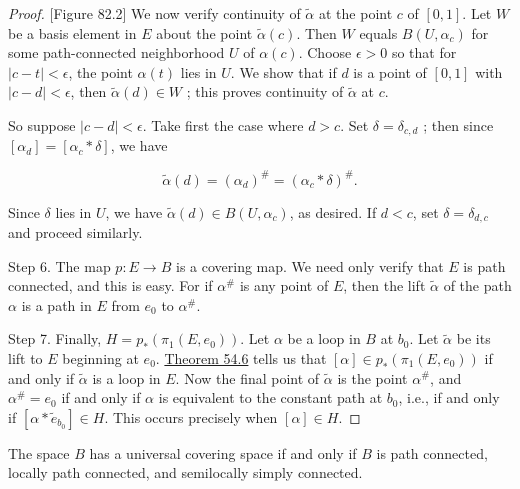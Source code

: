\begin{proof}
[Figure 82.2]
We now verify continuity of \(\widetilde{\alpha }\) at the point \(c\) of \([ {0,1}]\). Let \(W\) be a basis element in \(E\) about the point \(\widetilde{\alpha }( c)\). Then \(W\) equals \(B( {U,{\alpha }_{c}})\) for some path-connected neighborhood \(U\) of \(\alpha ( c)\). Choose \(\epsilon > 0\) so that for \(| {c - t}| < \epsilon\), the point \(\alpha ( t)\) lies in \(U\). We show that if \(d\) is a point of \([ {0,1}]\) with \(| {c - d}| < \epsilon\), then \(\widetilde{\alpha }( d) \in W\) ; this proves continuity of \(\widetilde{\alpha }\) at \(c\).

So suppose \(| {c - d}| < \epsilon\). Take first the case where \(d > c\). Set \(\delta = {\delta }_{c,d}\) ; then since \([ {\alpha }_{d}] = [ {{\alpha }_{c} * \delta }]\), we have

\[
\widetilde{\alpha }( d) = {( {\alpha }_{d}) }^{\# } = {( {\alpha }_{c} * \delta ) }^{\# }.
\]

Since \(\delta\) lies in \(U\), we have \(\widetilde{\alpha }( d) \in B( {U,{\alpha }_{c}})\), as desired. If \(d < c\), set \(\delta = {\delta }_{d,c}\) and proceed similarly.

Step 6. The map \(p : E \rightarrow B\) is a covering map. We need only verify that \(E\) is path connected, and this is easy. For if \({\alpha }^{\# }\) is any point of \(E\), then the lift \(\widetilde{\alpha }\) of the path \(\alpha\) is a path in \(E\) from \(e_{0}\) to \({\alpha }^{\# }\).

Step 7. Finally, \(H = p_{ * }( {{\pi }_{1}( {E,e_{0}}) })\). Let \(\alpha\) be a loop in \(B\) at \(b_{0}\). Let \(\widetilde{\alpha }\) be its lift to \(E\) beginning at \(e_{0}\). \hyperref[thm:54.6]{Theorem 54.6} tells us that \([ \alpha ] \in {p}_{ * }( {{\pi }_{1}( {E,e_{0}}) })\) if and only if \(\widetilde{\alpha }\) is a loop in \(E\). Now the final point of \(\widetilde{\alpha }\) is the point \({\alpha }^{\# }\), and \({\alpha }^{\# } = e_{0}\) if and only if \(\alpha\) is equivalent to the constant path at \(b_{0}\), i.e., if and only if \([ {\alpha * \widetilde{e}_{b_{0}}}] \in H\). This occurs precisely when \([ \alpha ] \in H\).
\end{proof}
\begin{corollary}
\label{cor:\thetheorem}
	The space \(B\) has a universal covering space if and only if \(B\) is path connected, locally path connected, and semilocally simply connected.
\end{corollary}

